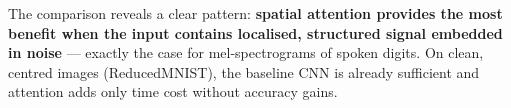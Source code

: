 The comparison reveals a clear pattern: \textbf{spatial attention provides the most
benefit when the input contains localised, structured signal embedded in noise} ---
exactly the case for mel-spectrograms of spoken digits. On clean, centred images
(ReducedMNIST), the baseline CNN is already sufficient and attention adds only
time cost without accuracy gains.

\endgroup
